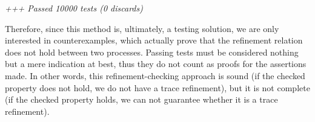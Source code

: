 \begin{tabbing}
	\emph{+++ Passed 10000 tests (0 discards)}
\end{tabbing}

Therefore, since this method is, ultimately, a testing solution, we are only interested in counterexamples, which actually prove that the refinement relation does not hold between two processes. Passing tests must be considered nothing but a mere indication at best, thus they do not count as proofs for the assertions made. In other words, this refinement-checking approach is sound (if the checked property does not hold, we do not have a trace refinement), but it is not complete (if the checked property holds, we can not guarantee whether it is a trace refinement).
